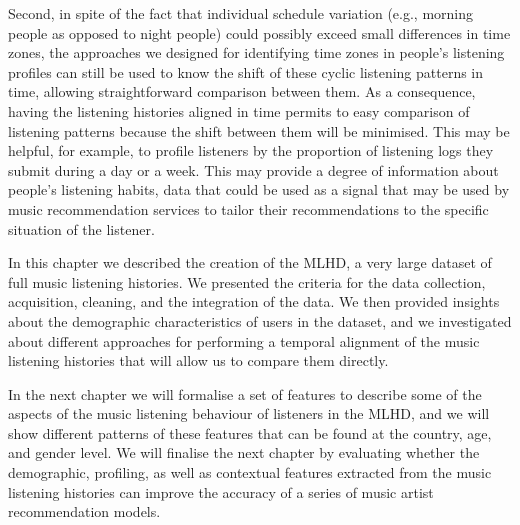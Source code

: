 Second, in spite of the fact that individual schedule variation (e.g., morning people as opposed to night people) could possibly exceed small differences in time zones, the approaches we designed for identifying time zones in people's listening profiles can still be used to know the shift of these cyclic listening patterns in time, allowing straightforward comparison between them. 
As a consequence, having the listening histories aligned in time permits to easy comparison of listening patterns because the shift between them will be minimised. This may be helpful, for example, to profile listeners by the proportion of listening logs they submit during a day or a week. This may provide a degree of information about people's listening habits, data that could be used as a signal that may be used by music recommendation services to tailor their recommendations to the specific situation of the listener.


In this chapter we described the creation of the MLHD, a very large dataset of full music listening histories. We presented the criteria for the data collection, acquisition, cleaning, and the integration of the data. We then provided insights about the demographic characteristics of users in the dataset, and we investigated about different approaches for performing a temporal alignment of the music listening histories that will allow us to compare them directly.

In the next chapter we will formalise a set of features to describe some of the aspects of the music listening behaviour of listeners in the MLHD, and we will show different patterns of these features that can be found at the country, age, and gender level. 
We will finalise the next chapter by evaluating whether the demographic, profiling, as well as contextual features extracted from the music listening histories can improve the accuracy of a series of music artist recommendation models.


























